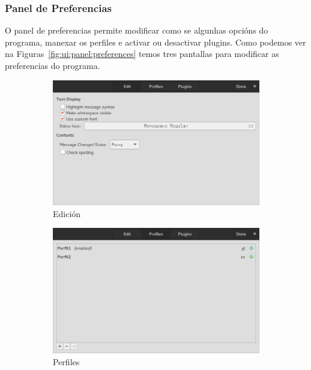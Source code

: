 \subsubsection{Panel de Preferencias}
O panel de preferencias permite modificar como se algunhas opcións do programa, manexar os perfiles e activar ou desactivar plugins. Como podemos ver na Figuras~\ref{fig:ui:panel:preferences} temos tres pantallas para modificar as preferencias do programa.

\begin{figure}[h!]
  \centering
  \begin{subfigure}[b]{0.56\textwidth}
    \includegraphics[width=\textwidth]{img/panel_preferencias_edicion.png}
    \caption{Edición}
  \end{subfigure}
  \begin{subfigure}[b]{0.56\textwidth}
    \includegraphics[width=\textwidth]{img/panel_preferencias_perfiles.png}
    \caption{Perfiles}
  \end{subfigure}
  \begin{subfigure}[b]{0.56\textwidth}

\end{subfigure}
\end{figure}
